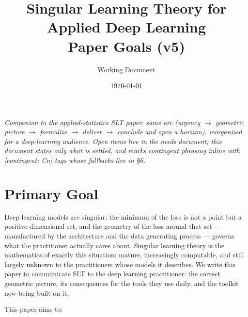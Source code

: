 \documentclass[11pt]{article}
\title{\textbf{Singular Learning Theory for Applied Deep Learning}\\[8pt]
\large Paper Goals (v5)}
\author{Working Document}
\date{\today}
\begin{document}
\maketitle

\noindent\emph{Companion to the applied-statistics SLT paper: same arc
(urgency $\to$ geometric picture $\to$ formalize $\to$ deliver $\to$
conclude and open a horizon), reorganized for a deep-learning audience.
Open items live in the needs document; this document states only what is
settled, and marks contingent phrasing inline with [contingent: Cn]
tags whose fallbacks live in \S6.}

\section{Primary Goal}

Deep learning models are singular: the minimum of the loss is not a
point but a positive-dimensional set, and the geometry of the loss
around that set --- manufactured by the architecture and the data
generating process --- governs what the practitioner actually cares
about. Singular learning theory is the mathematics of exactly this
situation: mature, increasingly computable, and still largely unknown
to the practitioners whose models it describes. We write this paper to
communicate SLT to the deep learning practitioner: the correct
geometric picture, its consequences for the tools they use daily, and
the toolkit now being built on it.

This paper aims to:
\end{document}
